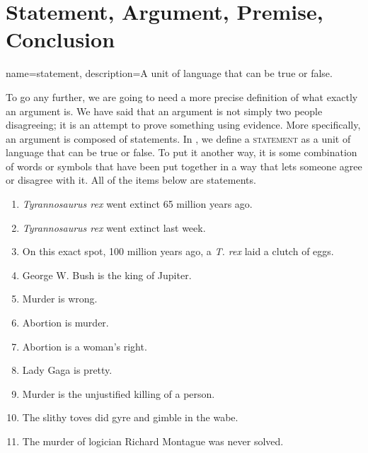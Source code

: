
\section{Statement, Argument, Premise, Conclusion}
\label{sec:SAPC}

{
name=statement,
description={A unit of language that can be true or false.}
}

 To go any further, we are going to need a more precise definition of what exactly an argument is. We have said that an argument is not simply two people disagreeing; it is an attempt to prove something using evidence. More specifically, an argument is composed of statements. In , we define a \textsc{\gls{statement}} \label{def:statement} as a unit of language that can be true or false. To put it another way, it is some combination of words or symbols that have been put together in a way that lets someone agree or disagree with it. All of the items below are statements.

\begin{enumerate}[label=(\alph*)]
\item \label{itm:t.rex_true}\emph{Tyrannosaurus rex} went extinct 65 million years ago. 
\item \label{itm:t.rex_false}\emph{Tyrannosaurus rex} went extinct last week.
\item \label{itm:t.rex_unknown}On this exact spot, 100  million years ago, a \emph{T. rex} laid a clutch of eggs. 
\item \label{itm:silly}George W. Bush is the king of Jupiter. 
\item \label{itm:moral}Murder is wrong. 
\item \label{itm:opinion1}Abortion is murder. 
\item \label{itm:opinion2}Abortion is a woman's right. 
\item \label{itm:opinion3}Lady Gaga is pretty.
\item \label{itm:definition}Murder is the unjustified killing of a person.
\item \label{itm:nonsense}The slithy toves did gyre and gimble in the wabe.
\item \label{itm:history}The murder of logician Richard Montague was never solved. 
\end{enumerate}

